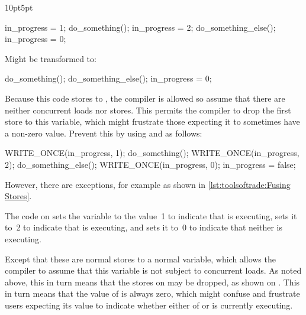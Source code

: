 \begin{description}[labelsep=.4em]
\begin{listing}[tb]
\begin{adjustwidth}{10pt}{5pt}
\footnotesize
\renewcommand{\myfvline}{A\arabic{FancyVerbLine}}
\begin{fcvlabel}
\begin{VerbatimT}[commandchars=\\\[\]]
in_progress = 1;		\lnlbl[A1]
do_something();			\lnlbl[A2]
in_progress = 2;		\lnlbl[A3]
do_something_else();		\lnlbl[A4]
in_progress = 0;		\lnlbl[A5]
\end{VerbatimT}
Might be transformed to:
\renewcommand{\myfvline}{B\arabic{FancyVerbLine}}
\begin{VerbatimT}[commandchars=\\\[\]]
do_something();			\lnlbl[B1]
do_something_else();		\lnlbl[B2]
in_progress = 0;		\lnlbl[B3]
\end{VerbatimT}
Because this code stores to , the compiler is
allowed so assume that there are neither concurrent loads nor
stores.
This permits the compiler to drop the first store to this variable, which
might frustrate those expecting it to sometimes have a non-zero value.
Prevent this by using  and  as follows:
\renewcommand{\myfvline}{C\arabic{FancyVerbLine}}
\begin{VerbatimT}[commandchars=\\\[\]]
WRITE_ONCE(in_progress, 1);	\lnlbl[C1]
do_something();			\lnlbl[C2]
WRITE_ONCE(in_progress, 2);	\lnlbl[C3]
do_something_else();		\lnlbl[C4]
WRITE_ONCE(in_progress, 0);	\lnlbl[C5]
in_progress = false;		\lnlbl[C6]
\end{VerbatimT}
\end{fcvlabel}
\end{adjustwidth}
\caption{Fusing Stores}
\label{lst:toolsoftrade:Fusing Stores}
\end{listing}

However, there are exceptions, for example as shown in
\cref{lst:toolsoftrade:Fusing Stores}.
\begin{fcvref}
The code on  sets the variable  to the value~1
to indicate that  is executing,  sets it to~2
to indicate that  is executing, and  sets
it to~0 to indicate that neither is executing.

Except that these are normal stores to a normal variable, which allows the
compiler to assume that this variable is not subject to concurrent loads.
As noted above, this in turn means that the stores on 
may be dropped, as shown on .
This in turn means that the value of  is always zero,
which might confuse and frustrate users expecting its value to indicate
whether either of  or  is
currently executing.


\end{fcvref}
\end{description}
